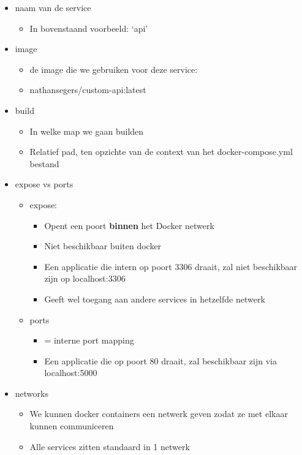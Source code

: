 \documentclass{article}
\begin{document}
\begin{itemize}
    \item naam van de service
    \begin{itemize}
        \item In bovenstaand voorbeeld: `api'
    \end{itemize}
    \item image
    \begin{itemize}
        \item de image die we gebruiken voor deze service:
        \item nathansegers/custom-api:latest
    \end{itemize}
    \item build
    \begin{itemize}
        \item In welke map we gaan builden
        \item Relatief pad, ten opzichte van de context van het docker-compose.yml bestand
    \end{itemize}
    \item expose vs ports
    \begin{itemize}
        \item expose: 
        \begin{itemize}
            \item Opent een poort \textbf{binnen} het Docker netwerk
            \item Niet beschikbaar buiten docker
            \item Een applicatie die intern op poort 3306 draait, zal niet beschikbaar zijn op localhost:3306
            \item Geeft wel toegang aan andere services in hetzelfde netwerk
        \end{itemize}
        \item ports
        \begin{itemize}
            \item = interne port mapping
            \item Een applicatie die op poort 80 draait, zal beschikbaar zijn via localhost:5000
        \end{itemize}
    \end{itemize}
    \item networks
    \begin{itemize}
        \item We kunnen docker containers een netwerk geven zodat ze met elkaar kunnen communiceren
        \item Alle services zitten standaard in 1 netwerk

\end{itemize}
\end{itemize}
\end{document}
